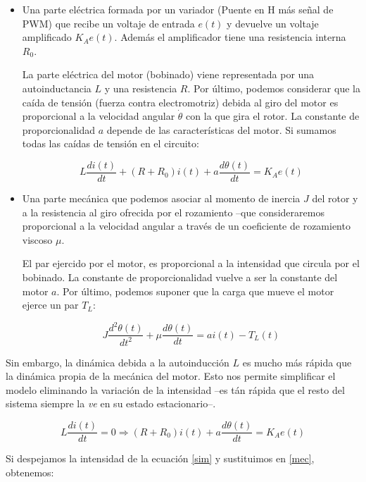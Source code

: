 \documentclass[10pt,a4paper]{report}
\begin{document}
\begin{itemize}
	\item Una parte eléctrica formada por un variador (Puente en H más señal de PWM)  que recibe un voltaje de entrada $e(t)$ y devuelve un voltaje amplificado $K_Ae(t)$. Además el amplificador tiene una resistencia interna $R_0$.

 La parte eléctrica del motor (bobinado) viene representada por una autoinductancia $L$ y una resistencia $R$. Por último, podemos considerar que la caída de tensión (fuerza contra electromotriz) debida al giro del motor es proporcional a la velocidad angular $\dot{\theta}$ con la que gira el rotor.  La constante de proporcionalidad $a$ depende de las características del motor. Si sumamos todas las caídas de tensión en el circuito:


\begin{equation}\label{elc}
L\frac{di(t)}{dt}+(R+R_0)i(t)+a\frac{d\theta(t)}{dt} = K_Ae(t)
\end{equation}

\item Una parte mecánica que podemos asociar al momento de inercia $J$ del rotor y  a la resistencia al giro ofrecida por el rozamiento --que consideraremos proporcional a la velocidad angular a través de un coeficiente de rozamiento viscoso $\mu$. 

El par ejercido por el motor, es proporcional a la intensidad que circula por el bobinado. La constante de proporcionalidad vuelve a ser la constante del motor $a$. Por último, podemos suponer que la carga que mueve el motor ejerce un par $T_L$:

\begin{equation}\label{mec}
J\frac{d^2\theta(t)}{dt^2}+\mu\frac{d\theta(t)}{dt} = ai(t)-T_L(t)
\end{equation}
\end{itemize}
Sin embargo, la dinámica debida a la autoinducción $L$ es mucho más rápida que la dinámica propia de la mecánica del motor.  Esto nos permite simplificar el modelo eliminando la variación de la intensidad --es tán rápida que el resto del sistema siempre la \emph{ve} en su estado estacionario--.

 \begin{equation}\label{sim}
L\frac{di(t)}{dt}= 0 \Rightarrow (R+R_0)i(t)+a\frac{d\theta(t)}{dt} = K_Ae(t)
\end{equation}

Si despejamos la intensidad de la ecuación \ref{sim} y sustituimos en \ref{mec}, obtenemos:
\end{document}

